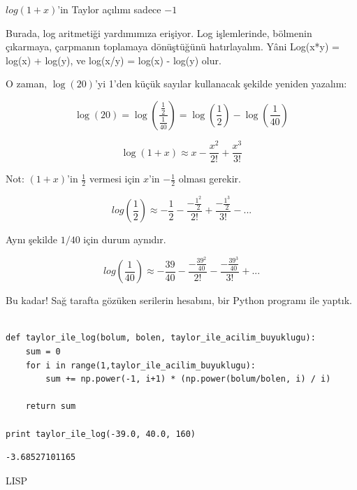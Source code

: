 \documentclass[12pt,fleqn]{article}\usepackage{../../common}
\begin{document}
$log(1+x)$'in Taylor açılımı sadece $-1$ 

Burada, log aritmetiği yardımımıza erişiyor. Log işlemlerinde, bölmenin
çıkarmaya, çarpmanın toplamaya dönüştüğünü hatırlayalım. Yâni Log(x*y) =
log(x) + log(y), ve log(x/y) = log(x) - log(y) olur.

O zaman, $\log(20)$'yi 1'den küçük sayılar kullanacak şekilde yeniden
yazalım:

$$ 
\log(20) = \log( \frac{\frac{1}{2}}{\frac{1}{40}}) = \log(\frac{1}{2})-\log(\frac{1}{40})
$$

$$ \log(1+x) \approx x - \frac{x^2}{2!} + \frac{x^3}{3!} $$

Not: $(1+x)$'in $\frac{1}{2}$ vermesi için $x$'in $-\frac{1}{2}$ olması
gerekir. 

$$ 
log(\frac{1}{2}) \approx -\frac{1}{2} - \frac{-\frac{1^2}{2}}{2!}  + 
\frac{-\frac{1^3}{2}}{3!} - ...
$$

Aynı şekilde $1/40$ için durum aynıdır.

$$ 
log(\frac{1}{40}) \approx
-\frac{39}{40} -
\frac{-\frac{39^2}{40}}{2!} -
\frac{-\frac{39^3}{40}}{3!} + ...
$$

Bu kadar! Sağ tarafta gözüken serilerin hesabını, bir Python programı 
ile yaptık.

\begin{verbatim}

def taylor_ile_log(bolum, bolen, taylor_ile_acilim_buyuklugu):
    sum = 0
    for i in range(1,taylor_ile_acilim_buyuklugu):
        sum += np.power(-1, i+1) * (np.power(bolum/bolen, i) / i)

    return sum
        
print taylor_ile_log(-39.0, 40.0, 160)
\end{verbatim}

\begin{verbatim}
-3.68527101165
\end{verbatim}
LISP
\end{document}
